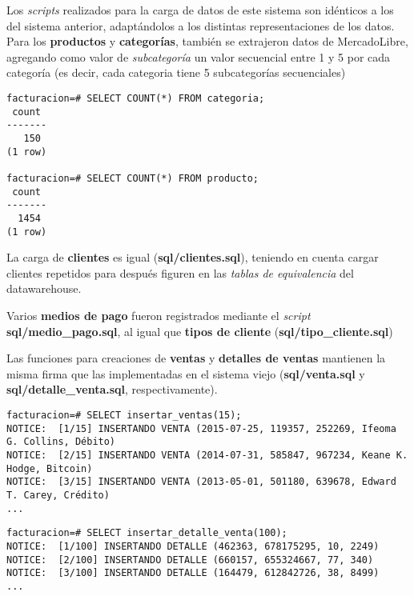 Los \emph{scripts} realizados para la carga de datos de este sistema son idénticos a los del sistema anterior, adaptándolos a los distintas representaciones de los datos. Para los \textbf{productos} y \textbf{categorías}, también se extrajeron datos de MercadoLibre, agregando como valor de \emph{subcategoría} un valor secuencial entre 1 y 5 por cada categoría (es decir, cada categoria tiene 5 subcategorías secuenciales)

\vspace*{5mm}
\begin{lstlisting}[title=Cantidad de categorías y productos disponibles en el sistema de facturación actual]
facturacion=# SELECT COUNT(*) FROM categoria;
 count 
-------
   150
(1 row)

facturacion=# SELECT COUNT(*) FROM producto;
 count 
-------
  1454
(1 row)
\end{lstlisting}

La carga de \textbf{clientes} es igual (\textbf{sql/clientes.sql}), teniendo en cuenta cargar clientes repetidos para después figuren en las \emph{tablas de equivalencia} del datawarehouse. 

Varios \textbf{medios de pago} fueron registrados mediante el \emph{script} \textbf{sql/medio\_pago.sql}, al igual que \textbf{tipos de cliente} (\textbf{sql/tipo\_cliente.sql})   

Las funciones para creaciones de \textbf{ventas} y \textbf{detalles de ventas} mantienen la misma firma que las implementadas en el sistema viejo (\textbf{sql/venta.sql} y \textbf{sql/detalle\_venta.sql}, respectivamente). 

\vspace*{5mm}
\begin{lstlisting}[title=Inserción de 15 ventas aleatorias en la BD]
facturacion=# SELECT insertar_ventas(15);
NOTICE:  [1/15] INSERTANDO VENTA (2015-07-25, 119357, 252269, Ifeoma G. Collins, Débito)
NOTICE:  [2/15] INSERTANDO VENTA (2014-07-31, 585847, 967234, Keane K. Hodge, Bitcoin)
NOTICE:  [3/15] INSERTANDO VENTA (2013-05-01, 501180, 639678, Edward T. Carey, Crédito)
...
\end{lstlisting}

\vspace*{5mm}
\begin{lstlisting}[title=Inserción de 100 detalles de ventas aleatorias en la BD]
facturacion=# SELECT insertar_detalle_venta(100);
NOTICE:  [1/100] INSERTANDO DETALLE (462363, 678175295, 10, 2249)
NOTICE:  [2/100] INSERTANDO DETALLE (660157, 655324667, 77, 340)
NOTICE:  [3/100] INSERTANDO DETALLE (164479, 612842726, 38, 8499)
...
\end{lstlisting}



